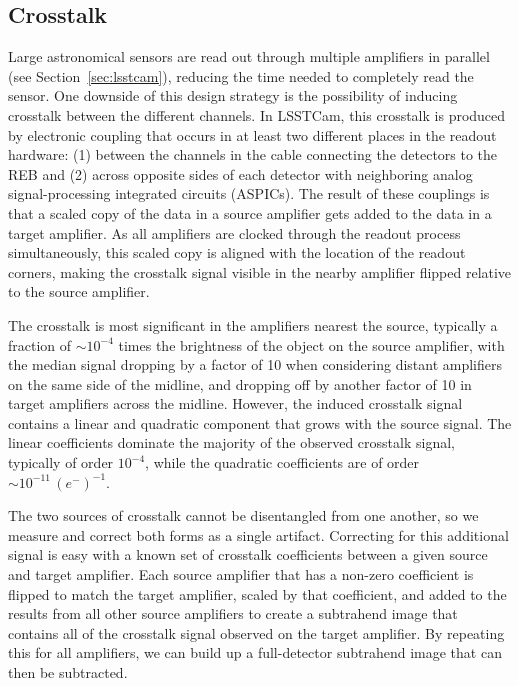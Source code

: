 \subsection{Crosstalk} \label{sec:calibration-production:xtalk}
Large astronomical sensors are read out through multiple amplifiers in parallel (see Section~\ref{sec:lsstcam}), reducing the time needed to completely read the sensor.
One downside of this design strategy is the possibility of inducing crosstalk between the different channels.
In LSSTCam, this crosstalk is produced by electronic coupling that occurs in at least two different places in the readout hardware: (1) between the channels in the cable connecting the detectors to the REB and (2) across opposite sides of each detector with neighboring analog signal-processing integrated circuits (ASPICs).
The result of these couplings is that a scaled copy of the data in a source amplifier gets added to the data in a target amplifier.
As all amplifiers are clocked through the readout process simultaneously, this scaled copy is aligned with the location of the readout corners, making the crosstalk signal visible in the nearby amplifier flipped relative to the source amplifier.

The crosstalk is most significant in the amplifiers nearest the source, typically a fraction of $\sim10^{-4}$ times the brightness of the object on the source amplifier, with the median signal dropping by a factor of 10 when considering distant amplifiers on the same side of the midline, and dropping off by another factor of 10 in target amplifiers across the midline.
However, the induced crosstalk signal contains a linear and quadratic component that grows with the source signal.
The linear coefficients dominate the majority of the observed crosstalk signal, typically of order $10^{-4}$, while the quadratic coefficients are of order $\sim10^{-11}\,(e^-)^{-1}$.

The two sources of crosstalk cannot be disentangled from one another, so we measure and correct both forms as a single artifact.
Correcting for this additional signal is easy with a known set of crosstalk coefficients between a given source and target amplifier. Each source amplifier that has a non-zero coefficient is flipped to match the target amplifier, scaled by that coefficient, and added to the results from all other source amplifiers to create a subtrahend image that contains all of the crosstalk signal observed on the target amplifier.
By repeating this for all amplifiers, we can build up a full-detector subtrahend image that can then be subtracted.

